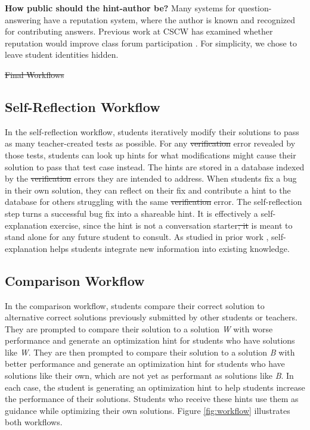 \documentclass[12pt,twoside]{mitthesis}
\providecommand{\DIFaddtex}[1]{{\protect\color{blue}\uwave{#1}}} %
\providecommand{\DIFdeltex}[1]{{\protect\color{red}\sout{#1}}}                      %
\providecommand{\DIFaddbegin}{} %
\providecommand{\DIFaddend}{} %
\providecommand{\DIFdelbegin}{} %
\providecommand{\DIFdelend}{} %
\providecommand{\DIFadd}[1]{\texorpdfstring{\DIFaddtex{#1}}{#1}} %
\providecommand{\DIFdel}[1]{\texorpdfstring{\DIFdeltex{#1}}{}} %
\begin{document}
{\DIFdelbegin %
\DIFdelend \DIFaddbegin \bf \DIFaddend How public should the hint-author be?} Many systems for question-answering have a reputation system, where the author is known and recognized for contributing answers. Previous work at CSCW has examined whether reputation would improve class forum participation \cite{reputation}. For simplicity, we chose to leave student identities hidden.

\DIFdelbegin %
\DIFdel{Final Workflows}%
\DIFdelend \DIFaddbegin \subsection{Self-Reflection Workflow} 

\DIFaddend In the self-reflection workflow, students iteratively modify their solutions to pass as many teacher-created tests as possible. For any \DIFdelbegin \DIFdel{verification }\DIFdelend \DIFaddbegin \DIFadd{autograder }\DIFaddend error revealed by those tests, students can look up hints for what modifications might cause their solution to pass that test case instead. The hints are stored in a database indexed by the \DIFdelbegin \DIFdel{verification }\DIFdelend \DIFaddbegin \DIFadd{autograder }\DIFaddend errors they are intended to address. When students fix a bug in their own solution, they can reflect on their fix and contribute a hint to the database for others struggling with the same \DIFdelbegin \DIFdel{verification }\DIFdelend \DIFaddbegin \DIFadd{autograder }\DIFaddend error. The self-reflection step turns a successful bug fix into a shareable hint. It is effectively a self-explanation exercise, since the hint is not a conversation starter\DIFdelbegin \DIFdel{; it }\DIFdelend \DIFaddbegin \DIFadd{. It }\DIFaddend is meant to stand alone for any future student to consult. As studied in prior work \cite{selfexplanation}, self-explanation helps students integrate new information into existing knowledge.

\DIFaddbegin \subsection{Comparison Workflow} 

\DIFaddend In the comparison workflow, students compare their correct solution to alternative correct solutions previously submitted by other students or teachers. They are prompted to compare their solution to a solution \textit{W} with worse performance and generate an optimization hint for students who have solutions like \textit{W}. They are then prompted to compare their solution to a solution \textit{B} with better performance and generate an optimization hint for students who have solutions like their own, which are not yet as performant as solutions like \textit{B}. In each case, the student is generating an optimization hint to help students increase the performance of their solutions. Students who receive these hints use them as guidance while optimizing their own solutions. Figure \ref{fig:workflow} illustrates both workflows.
\end{document}
